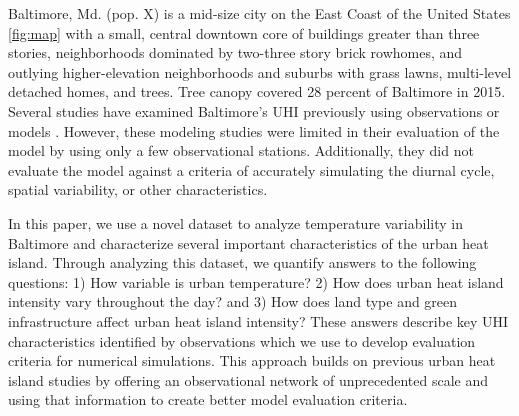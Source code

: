 \documentclass[draft,linenumbers]{agujournal}
\begin{document}
Baltimore, Md. (pop. X) is a mid-size city on the East Coast of the United States \ref{fig:map}  with a small, central downtown core of buildings greater than three stories, neighborhoods dominated by two-three story brick rowhomes, and outlying higher-elevation neighborhoods and suburbs with grass lawns, multi-level detached homes, and trees. Tree canopy covered 28 percent of Baltimore in 2015. 
 Several studies have examined Baltimore's UHI previously using observations \citep{Huang20111753,scott2017intraurban,brazel2000tale} or models \citep{zhang2011impact,li2013development,li2013synergistic,li2015contrasting}. However, these modeling studies were limited in their evaluation of the model by using only a few observational stations. Additionally, they did not evaluate the model against a criteria of accurately simulating the diurnal cycle, spatial variability, or other characteristics. 

In this paper, we use a novel dataset to analyze temperature variability in Baltimore and characterize several important characteristics of the urban heat island. Through analyzing this dataset, we quantify answers to the following questions: 
1) How variable is urban temperature? 
2) How does urban heat island intensity vary throughout the day? and
3) How does land type and green infrastructure affect urban heat island intensity? 
These answers describe key UHI characteristics identified by observations which we use to develop evaluation criteria for numerical simulations. 
This approach builds on previous urban heat island studies by offering an observational network of unprecedented scale and using that information to create better model evaluation criteria. 
\end{document}
